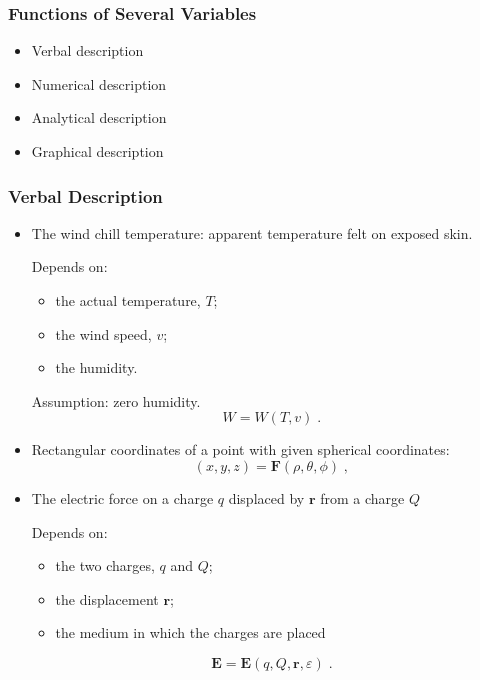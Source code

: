 \begin{frame}
\frametitle{Functions of Several Variables}

\begin{itemize}
\item Verbal description

\item Numerical description

\item Analytical description

\item Graphical description

\end{itemize}
\end{frame}

\begin{frame}
\frametitle{Verbal Description}

\begin{itemize}
\item The wind chill temperature: apparent temperature felt on exposed skin.

Depends on:
\begin{itemize}
\item the actual temperature, $T$;
\item the wind speed, $v$;
\item the humidity.
\end{itemize}

Assumption: zero humidity.
  $$W = W(T,v)\; .$$

  \item Rectangular coordinates of a point with given spherical coordinates:
  $$(x,y,z) = \textbf{F}(\rho, \theta, \phi)\; ,$$

  \item The electric force on a charge $q$ displaced
  by $\textbf{r}$ from a charge $Q$
  
  Depends on:
  \begin{itemize}
  \item the two charges, $q$ and $Q$;
  \item the displacement $\textbf{r}$;
  \item  the medium in which the charges are placed
  \end{itemize}
  $$\textbf{E} =
  \textbf{E}(q, Q,\textbf{r}, \varepsilon)\; .$$
 

\end{itemize}
\end{frame}

